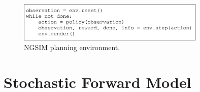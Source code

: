 \documentclass{article} %
\begin{document}
\begin{figure}
  \centering
  \includegraphics[width=0.8\textwidth]{figures/driving/traffic_gym_code-crop.pdf}
  \caption{NGSIM planning environment.}
\label{interface}
\end{figure}















\section{Stochastic Forward Model}
\end{document}
